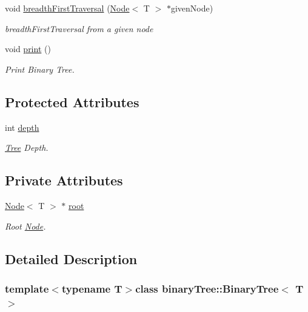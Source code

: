 \begin{DoxyCompactItemize}
void \hyperlink{classbinaryTree_1_1BinaryTree_ae18f2e99a100b60ca68c7d85563e6676}{breadth\-First\-Traversal} (\hyperlink{structbinaryTree_1_1Node}{Node}$<$ T $>$ $\ast$given\-Node)
\begin{DoxyCompactList}\small\item\em breadth\-First\-Traversal from a given node \end{DoxyCompactList}\item 
void \hyperlink{classbinaryTree_1_1BinaryTree_ad57b6b69f944ae45262c635fb7cc3bdc}{print} ()
\begin{DoxyCompactList}\small\item\em Print Binary Tree. \end{DoxyCompactList}\end{DoxyCompactItemize}
\subsection*{Protected Attributes}
\begin{DoxyCompactItemize}
\item 
int \hyperlink{classtree_1_1Tree_ae808b4b4b204faaa40e1e636ebfab8e6}{depth}
\begin{DoxyCompactList}\small\item\em \hyperlink{classtree_1_1Tree}{Tree} Depth. \end{DoxyCompactList}\end{DoxyCompactItemize}
\subsection*{Private Attributes}
\begin{DoxyCompactItemize}
\item 
\hyperlink{structbinaryTree_1_1Node}{Node}$<$ T $>$ $\ast$ \hyperlink{classbinaryTree_1_1BinaryTree_a4acdb7e36855c68a15a315ece7b6a6d3}{root}
\begin{DoxyCompactList}\small\item\em Root \hyperlink{structbinaryTree_1_1Node}{Node}. \end{DoxyCompactList}\end{DoxyCompactItemize}


\subsection{Detailed Description}
\subsubsection*{template$<$typename T$>$class binary\-Tree\-::\-Binary\-Tree$<$ T $>$}

